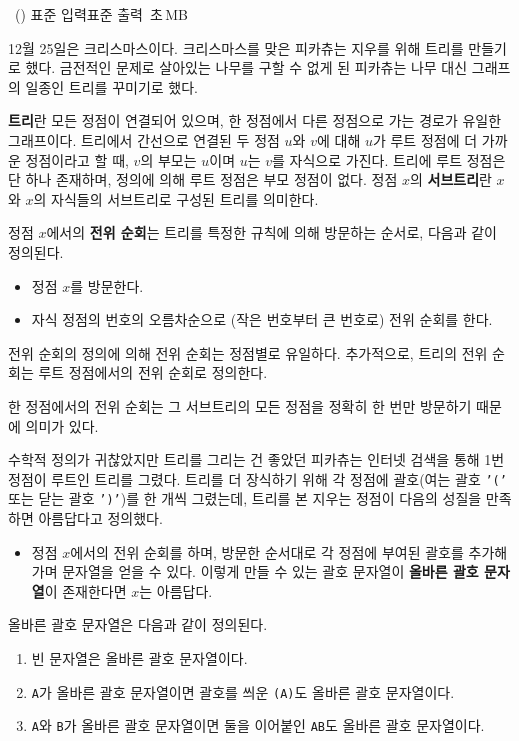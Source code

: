 \begin{problem}{\kcpcprobpretty\ (\kcpcprobprettyshort)}
    {표준 입력}{표준 출력}
    {\kcpcprobprettytime\,초}{\kcpcprobprettymemory\,MB}{}
     
    12월 25일은 크리스마스이다. 크리스마스를 맞은 피카츄는 지우를 위해 트리를 만들기로 했다. 금전적인 문제로 살아있는 나무를 구할 수 없게 된 피카츄는 나무 대신 그래프의 일종인 트리를 꾸미기로 했다.
    
    \textbf{트리}란 모든 정점이 연결되어 있으며, 한 정점에서 다른 정점으로 가는 경로가 유일한 그래프이다. 트리에서 간선으로 연결된 두 정점 $u$와 $v$에 대해 $u$가 루트 정점에 더 가까운 정점이라고 할 때, $v$의 부모는 $u$이며 $u$는 $v$를 자식으로 가진다. 트리에 루트 정점은 단 하나 존재하며, 정의에 의해 루트 정점은 부모 정점이 없다. 정점 $x$의 \textbf{서브트리}란 $x$와 $x$의 자식들의 서브트리로 구성된 트리를 의미한다.
    
    정점 $x$에서의 \textbf{전위 순회}는 트리를 특정한 규칙에 의해 방문하는 순서로, 다음과 같이 정의된다.
    
    \begin{itemize}
        \item 정점 $x$를 방문한다.
        \item 자식 정점의 번호의 오름차순으로 (작은 번호부터 큰 번호로) 전위 순회를 한다.
    \end{itemize}
    전위 순회의 정의에 의해 전위 순회는 정점별로 유일하다. 추가적으로, 트리의 전위 순회는 루트 정점에서의 전위 순회로 정의한다.
    
    한 정점에서의 전위 순회는 그 서브트리의 모든 정점을 정확히 한 번만 방문하기 때문에 의미가 있다.
    
    수학적 정의가 귀찮았지만 트리를 그리는 건 좋았던 피카츄는 인터넷 검색을 통해 1번 정점이 루트인 트리를 그렸다. 트리를 더 장식하기 위해 각 정점에 괄호(여는 괄호 \texttt{'('} 또는 닫는 괄호 \texttt{')'})를 한 개씩 그렸는데, 트리를 본 지우는 정점이 다음의 성질을 만족하면 아름답다고 정의했다.
    
    \begin{itemize}
        \item 정점 $x$에서의 전위 순회를 하며, 방문한 순서대로 각 정점에 부여된 괄호를 추가해가며 문자열을 얻을 수 있다. 이렇게 만들 수 있는 괄호 문자열이 \textbf{올바른 괄호 문자열}이 존재한다면 $ x $는 아름답다.    
    \end{itemize}
    
    올바른 괄호 문자열은 다음과 같이 정의된다.
    \begin{enumerate}
        \item 빈 문자열은 올바른 괄호 문자열이다.
        \item \texttt{A}가 올바른 괄호 문자열이면 괄호를 씌운 \texttt{(A)}도 올바른 괄호 문자열이다.
        \item \texttt{A}와 \texttt{B}가 올바른 괄호 문자열이면 둘을 이어붙인 \texttt{AB}도 올바른 괄호 문자열이다.
    \end{enumerate}
    

\end{problem}
